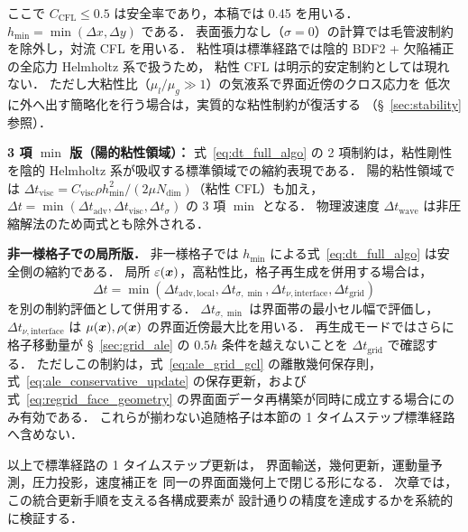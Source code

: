 ここで $C_{\mathrm{CFL}} \le 0.5$ は安全率であり，本稿では 0.45 を用いる．
$h_{\min} = \min(\Delta x, \Delta y)$ である．
表面張力なし（$\sigma=0$）の計算では毛管波制約を除外し，対流 CFL を用いる．
粘性項は標準経路では陰的 BDF2 + 欠陥補正の全応力 Helmholtz 系で扱うため，
粘性 CFL は明示的安定制約としては現れない．
ただし大粘性比（$\mu_l/\mu_g \gg 1$）の気液系で界面近傍のクロス応力を
低次に外へ出す簡略化を行う場合は，実質的な粘性制約が復活する
（§~\ref{sec:stability} 参照）．

\noindent\textbf{3 項 $\min$ 版（陽的粘性領域）：}
式~\eqref{eq:dt_full_algo} の 2 項制約は，粘性剛性を陰的 Helmholtz 系が吸収する標準領域での縮約表現である．
陽的粘性領域では $\Delta t_\text{visc} = C_\text{visc}\rho h_{\min}^2/(2\mu N_\text{dim})$（粘性 CFL）も加え，
$\Delta t = \min(\Delta t_\text{adv}, \Delta t_\text{visc}, \Delta t_\sigma)$ の 3 項 $\min$ となる．
物理波速度 $\Delta t_\text{wave}$ は非圧縮解法のため両式とも除外される．

\noindent\textbf{非一様格子での局所版．}
非一様格子では $h_{\min}$ による式~\eqref{eq:dt_full_algo} は安全側の縮約である．
局所 $\varepsilon(\bm{x})$，高粘性比，格子再生成を併用する場合は，
\[
  \Delta t =
  \min\!\left(
    \Delta t_{\mathrm{adv,local}},
    \Delta t_{\sigma,\min},
    \Delta t_{\nu,\mathrm{interface}},
    \Delta t_{\mathrm{grid}}
  \right)
\]
を別の制約評価として併用する．
$\Delta t_{\sigma,\min}$ は界面帯の最小セル幅で評価し，
$\Delta t_{\nu,\mathrm{interface}}$ は $\mu(\bm{x}),\rho(\bm{x})$ の界面近傍最大比を用いる．
再生成モードではさらに格子移動量が §~\ref{sec:grid_ale} の $0.5h$ 条件を越えないことを
$\Delta t_{\mathrm{grid}}$ で確認する．
ただしこの制約は，式~\eqref{eq:ale_grid_gcl} の離散幾何保存則，
式~\eqref{eq:ale_conservative_update} の保存更新，および
式~\eqref{eq:regrid_face_geometry} の界面面データ再構築が同時に成立する場合にのみ有効である．
これらが揃わない追随格子は本節の 1 タイムステップ標準経路へ含めない．

\bigskip
以上で標準経路の 1 タイムステップ更新は，
界面輸送，幾何更新，運動量予測，圧力投影，速度補正を
同一の界面面幾何上で閉じる形になる．
次章では，この統合更新手順を支える各構成要素が
設計通りの精度を達成するかを系統的に検証する．
